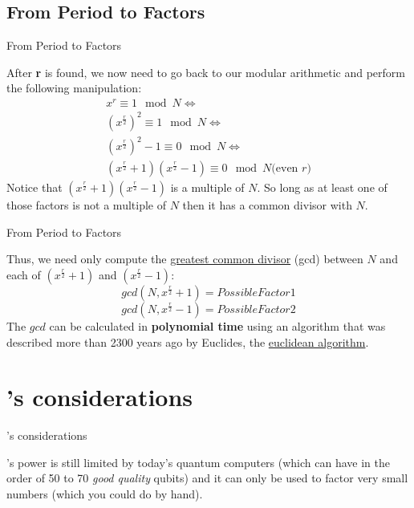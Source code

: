 \documentclass[aspectratio=43]{beamer}
\begin{document}
\newcommand{\xrsq}{x^{\frac{r}{2}}}
\newcommand{\pxrsq}{(\xrsq + 1)(\xrsq - 1)}
\subsection{From Period to Factors}
\begin{frame}{From Period to Factors}
    \begin{card}
        After \textbf{r} is found, we now need to go back to our modular arithmetic and perform the following manipulation:
        \begin{equation*}\begin{split}
            x^r \equiv 1 \mod N \Leftrightarrow \\ 
            (\xrsq)^2 \equiv 1 \mod N \Leftrightarrow \\
            (\xrsq)^2 - 1 \equiv 0 \mod N  \Leftrightarrow \\
            \pxrsq \equiv 0 \mod N \text{(even $r$)}
        \end{split}\end{equation*}
        Notice that $\pxrsq$ is a multiple of $N$. So long as at least one of those factors is not a multiple of $N$ then it has a common divisor with $N$.
    \end{card}
\pagenumber
\end{frame}

\begin{frame}{From Period to Factors}
    \begin{card}
        Thus, we need only compute the \href{https://en.wikipedia.org/wiki/Greatest_common_divisor}{greatest common divisor} (gcd) between $N$ and each of $(\xrsq + 1)$ and $(\xrsq - 1)$:
        \begin{equation*}
            gcd(N, \xrsq + 1) = PossibleFactor1
        \end{equation*}
        \begin{equation*}
            gcd(N, \xrsq - 1) = PossibleFactor2
        \end{equation*}
        The $gcd$ can be calculated in \textbf{polynomial time} using an algorithm that was described more than 2300 years ago by Euclides, the \href{https://en.wikipedia.org/wiki/Euclidean_algorithm}{euclidean algorithm}. 
    \end{card}
\pagenumber
\end{frame}

\section{\sa's considerations}
\begin{frame}{\sa's considerations}
    \begin{card}
        \sa's power is still limited by today's quantum computers (which can have in the order of 50 to 70 \textit{good quality} qubits) and it can only be used to factor very small numbers (which you could do by hand).
    \end{card}
\pagenumber
\end{frame}
\end{document}
